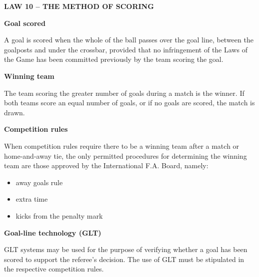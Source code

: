 \clearpage
\sffamily
{\bfseries\textcolor[rgb]{0.4,0.4,0.4}{LAW 10 -- THE METHOD OF SCORING} }

\bigskip

{\bfseries Goal scored }

\headlinebox

A goal is scored when the whole of the ball passes over the goal line, between the goalposts and under the crossbar, provided that no infringement of the Laws of the Game has been committed previously by the team scoring the goal.

\bigskip

{\bfseries Winning team}

\headlinebox

The team scoring the greater number of goals during a match is the winner. If both teams score an equal number of goals, or if no goals are scored, the match is drawn. 

\bigskip

{\bfseries Competition rules }

\headlinebox

When competition rules require there to be a winning team after a match or home-and-away tie, the only permitted procedures for determining the winning team are those approved by the International F.A. Board, namely:

\begin{itemize}
\item away goals rule
\item extra time
\item kicks from the penalty mark
\end{itemize}


{\bfseries Goal-line technology (GLT) }

\headlinebox

GLT systems may be used for the purpose of verifying whether a goal has been scored to support the referee{\textquoteright}s decision. The use of GLT must be stipulated in the respective competition rules.